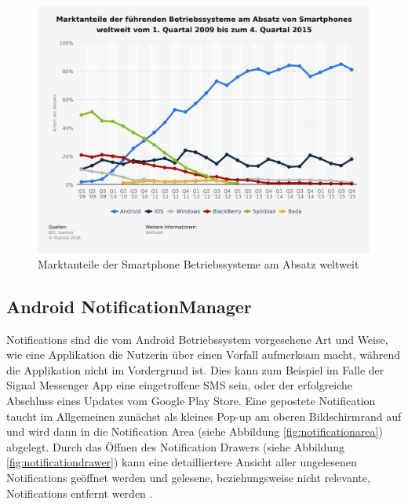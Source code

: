 \begin{figure}[h]
    \centering
    \includegraphics[width=\textwidth]{images/statistic_id73662_marktanteile-der-smartphone-betriebssysteme-am-absatz-weltweit-bis-q4-2015.pdf}
    \caption{Marktanteile der Smartphone Betriebssysteme am Absatz weltweit\cite{smartphonemarktanteil}}
    \label{fig:marktanteil}
\end{figure}


\subsection {Android NotificationManager}

Notifications sind die vom Android Betriebssystem vorgesehene Art und Weise, 
wie eine Applikation die Nutzerin über einen Vorfall aufmerksam macht, während die Applikation nicht im Vordergrund ist.
Dies kann zum Beispiel im Falle der Signal Messenger App eine eingetroffene SMS sein,
oder der erfolgreiche Abschluss eines Updates vom Google Play Store.
Eine gepostete Notification taucht im Allgemeinen zunächst als kleines Pop-up am oberen Bildschirmrand auf und wird dann in die 
Notification Area (siehe Abbildung \ref{fig:notificationarea}) abgelegt.
Durch das Öffnen des Notification Drawers (siehe Abbildung \ref{fig:notificationdrawer}) kann eine detailliertere Ansicht aller ungelesenen Notifications geöffnet werden und gelesene, beziehungsweise nicht relevante, Notifications entfernt werden 
\cite{androidnotification}.


